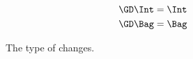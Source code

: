 \begin{figure}

\begin{align*}
\GD\Int & = \Int\\
\GD\Bag & = \Bag
\end{align*}
\caption{The type of changes.}
\label{fig:plug-change-types}
\end{figure}
